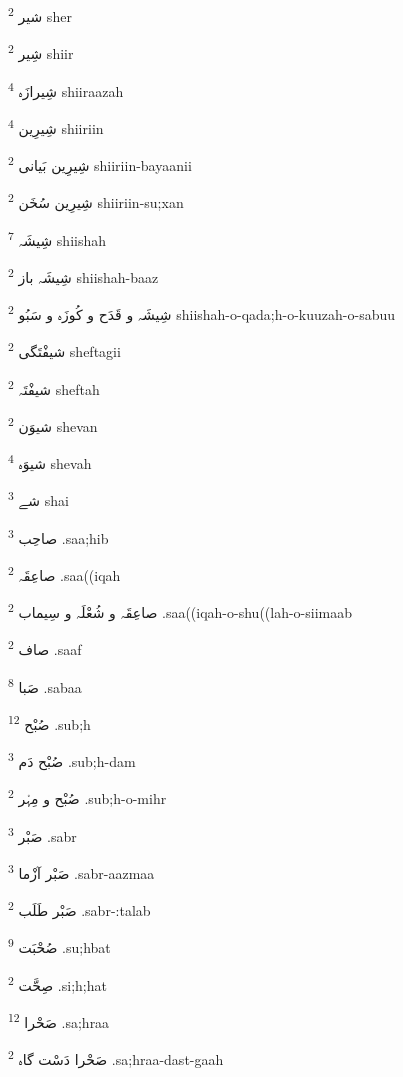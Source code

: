 \documentclass[12pt]{article}
\begin{document}
\begin{RTL}
\begin{multicols}{5}
{\ur شیر}   \textsuperscript{2} sher

{\ur شِیر}   \textsuperscript{2} shiir

{\ur شِیرازَہ}   \textsuperscript{4} shiiraazah

{\ur شِیرِین}   \textsuperscript{4} shiiriin

{\ur شِیرِین بَیانی}   \textsuperscript{2} shiiriin-bayaanii

{\ur شِیرِین سُخَن}   \textsuperscript{2} shiiriin-su;xan

{\ur شِیشَہ}   \textsuperscript{7} shiishah

{\ur شِیشَہ باز}   \textsuperscript{2} shiishah-baaz

{\ur شِیشَہ و قَدَح و کُوزَہ و سَبُو}   \textsuperscript{2} shiishah-o-qada;h-o-kuuzah-o-sabuu

{\ur شیفْتَگی}   \textsuperscript{2} sheftagii

{\ur شیفْتَہ}   \textsuperscript{2} sheftah

{\ur شیوَن}   \textsuperscript{2} shevan

{\ur شیوَہ}   \textsuperscript{4} shevah

{\ur شے}   \textsuperscript{3} shai

{\ur صاحِب}   \textsuperscript{3} .saa;hib

{\ur صاعِقَہ}   \textsuperscript{2} .saa((iqah

{\ur صاعِقَہ و شُعْلَہ و سِیماب}   \textsuperscript{2} .saa((iqah-o-shu((lah-o-siimaab

{\ur صاف}   \textsuperscript{2} .saaf

{\ur صَبا}   \textsuperscript{8} .sabaa

{\ur صُبْح}   \textsuperscript{12} .sub;h

{\ur صُبْح دَم}   \textsuperscript{3} .sub;h-dam

{\ur صُبْح و مِہْر}   \textsuperscript{2} .sub;h-o-mihr

{\ur صَبْر}   \textsuperscript{3} .sabr

{\ur صَبْر آزْما}   \textsuperscript{3} .sabr-aazmaa

{\ur صَبْر طَلَب}   \textsuperscript{2} .sabr-:talab

{\ur صُحْبَت}   \textsuperscript{9} .su;hbat

{\ur صِحَّت}   \textsuperscript{2} .si;h;hat

{\ur صَحْرا}   \textsuperscript{12} .sa;hraa

{\ur صَحْرا دَسْت گاہ}   \textsuperscript{2} .sa;hraa-dast-gaah


\end{multicols}
\end{RTL}
\end{document}
